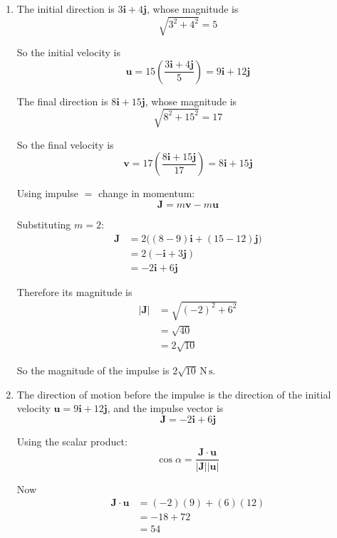 \documentclass[leqno]{article}
\begin{document}
\begin{enumerate}[
  label=\textbf{\arabic*.},
  leftmargin=*,
  topsep=0pt,
  partopsep=0pt,
  parsep=0pt
]
\vspace*{10pt}

\begin{djsSolution}
\begin{enumerate}[label=\textbf{(\alph*)}]
  \item The initial direction is $3\mathbf{i}+4\mathbf{j}$, whose magnitude is
  \[
  \sqrt{3^2+4^2}=5
  \]

  So the initial velocity is
  \[
  \mathbf{u}=15\left(\frac{3\mathbf{i}+4\mathbf{j}}{5}\right)=9\mathbf{i}+12\mathbf{j}
  \]

  The final direction is $8\mathbf{i}+15\mathbf{j}$, whose magnitude is
  \[
  \sqrt{8^2+15^2}=17
  \]

  So the final velocity is
  \[
  \mathbf{v}=17\left(\frac{8\mathbf{i}+15\mathbf{j}}{17}\right)=8\mathbf{i}+15\mathbf{j}
  \]

  Using impulse \(=\) change in momentum:
  \[
  \mathbf{J}=m\mathbf{v}-m\mathbf{u}
  \]

  Substituting $m=2$:
  \begin{align*}
  \mathbf{J}
  &=2\bigl((8-9)\mathbf{i}+(15-12)\mathbf{j}\bigr) \\
  &=2(-\mathbf{i}+3\mathbf{j}) \\
  &=-2\mathbf{i}+6\mathbf{j}
  \end{align*}

  Therefore its magnitude is
  \begin{align*}
  |\mathbf{J}|
  &=\sqrt{(-2)^2+6^2} \\
  &=\sqrt{40} \\
  &=2\sqrt{10}
  \end{align*}

  So the magnitude of the impulse is $2\sqrt{10}\,\mathrm{N\,s}$.

  \item The direction of motion before the impulse is the direction of the initial velocity $\mathbf{u}=9\mathbf{i}+12\mathbf{j}$, and the impulse vector is
  \[
  \mathbf{J}=-2\mathbf{i}+6\mathbf{j}
  \]

  Using the scalar product:
  \[
  \cos\alpha=\frac{\mathbf{J}\cdot\mathbf{u}}{|\mathbf{J}||\mathbf{u}|}
  \]

  Now
  \begin{align*}
  \mathbf{J}\cdot\mathbf{u}
  &=(-2)(9)+(6)(12) \\
  &=-18+72 \\
  &=54
  \end{align*}


\end{enumerate}
\end{djsSolution}
\end{enumerate}
\end{document}
